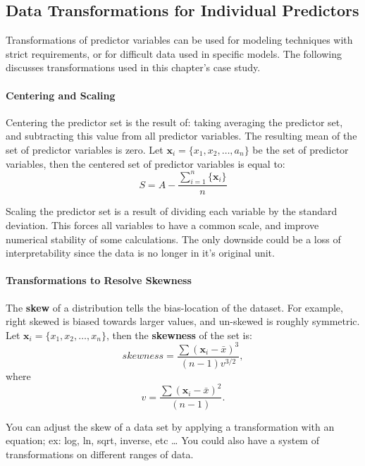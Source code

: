 \documentclass[../main.tex]{subfiles}
\begin{document}
\subsection{Data Transformations for Individual Predictors}

    Transformations of predictor variables can be used for modeling techniques with strict requirements, 
    or for difficult data used in specific models. The following discusses transformations used in this chapter's case study.

    \paragraph{Centering and Scaling}
    \begin{definition}[Centering]
        Centering the predictor set is the result of: taking averaging the predictor set, and subtracting this value from all predictor variables. The resulting mean of the set of predictor variables is zero.
        Let $ \textbf{x}_i = \{x_1, x_2, \dots, a_n\}$ be the set of predictor variables, then the centered set of predictor variables is equal to:
        \[ S = A  - \frac{\sum_{i=1}^{n}\{\textbf{x}_i\}}{n}\]
    \end{definition}
    \begin{definition}[Scaling]
        Scaling the predictor set is a result of dividing each variable by the standard deviation. 
        This forces all variables to have a common scale, and improve numerical stability of some calculations.
        The only downside could be a loss of interpretability since the data is no longer in it's original unit. 
    \end{definition}

    \paragraph{Transformations to Resolve Skewness}
    \begin{definition}[Skewness]
        The \textbf{skew} of a distribution tells the bias-location of the dataset. 
        For example, right skewed is biased towards larger values, and un-skewed is roughly symmetric.
        Let $ \textbf{x}_i= \{x_1, x_2, \dots, x_n\} $, then the \textbf{skewness} of the set is:
        \[skewness = \frac{\sum{(\textbf{x}_i -\bar{x})}^3}{(n-1)v^{3/2}},\]
        where \[v=\frac{\sum{(\textbf{x}_i -\bar{x})}^2}{(n-1)}.\]
    \end{definition}
    You can adjust the skew of a data set by applying a transformation with an equation; ex: log, ln, sqrt, inverse, etc \dots
    You could also have a system of transformations on different ranges of data.
\end{document}
